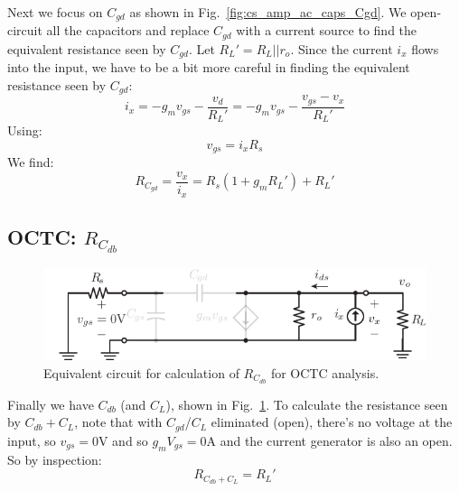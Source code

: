 Next we focus on $C_{gd}$ as shown in Fig.~\ref{fig:cs_amp_ac_caps_Cgd}.  We open-circuit all the capacitors and replace $C_{gd}$ with a current source to find the equivalent resistance seen by $C_{gd}$.  Let $R_L' = R_L || r_o$.  Since the current $i_x$ flows into the input, we have to be a bit more careful in finding the equivalent resistance seen by $C_{gd}$:
\begin{equation} 
	{i_x} = -{g_m}{v_{gs}} - \frac{{{v_d}}}{{R_L'}} = -{g_m}{v_{gs}} - \frac{{{v_{gs}}-{v_x} }}{{R_L'}} 
\end{equation}
Using:
\begin{equation} 
	{v_{gs}} =  {i_x}R_{s} 
\end{equation}
We find:
\begin{equation} 
	{R_{C_{gd}}} = \frac{{{v_x}}}{{{i_x}}} = R_{s}(1 + {g_m}R_L') + R_L' 
\end{equation}
\subsection{OCTC:  $R_{C_{db}}$}
\begin{figure}[tb]
\begin{center}
\includegraphics[scale=1]{cs_amp_ac_caps_Cdb}
\end{center}
\caption{Equivalent circuit for calculation of $R_{C_{db}}$ for OCTC analysis.} \label{fig:cs_amp_ac_caps_Cdb}
\end{figure}

Finally we have $C_{db}$ (and $C_L$), shown in Fig.~\ref{fig:cs_amp_ac_caps_Cdb}. To calculate the resistance seen by $C_{db} + C_L$, note that with $C_{gd}$/$C_L$ eliminated (open), there's no voltage at the input, so $v_{gs} = 0$V and so $g_m V_{gs} = 0$A and the current generator is also an open.  So by inspection:
\begin{equation}
	{R_{{C_{db}}+C_L}} = R_L'
\end{equation}
